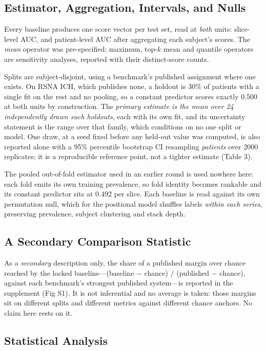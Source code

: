 \documentclass[11pt,letterpaper]{article}
\begin{document}
\subsection*{Estimator, Aggregation, Intervals, and Nulls}

Every baseline produces one score vector per test set, read at \emph{both}
units: slice-level AUC, and patient-level AUC after aggregating each subject's
scores. The \emph{mean} operator was pre-specified; maximum, top-$k$ mean and quantile
operators are sensitivity analyses, reported with their distinct-score counts.

Splits are subject-disjoint, using a benchmark's published assignment where one
exists. On RSNA ICH, which publishes none, a holdout is 30\% of patients with a
single fit on the rest and no pooling, so a constant predictor scores exactly
0.500 at both units by construction. The \emph{primary estimate is the mean over
24 independently drawn such holdouts}, each with its own fit, and its uncertainty
statement is the range over that family, which conditions on no one split or
model. One draw, at a seed fixed before any held-out value was computed, is also
reported alone with a 95\% percentile bootstrap CI resampling \emph{patients}
over 2000 replicates; it is a reproducible reference point, not a tighter
estimate (Table 3).

The pooled out-of-fold estimator used in an earlier round is used nowhere here:
each fold emits its own training prevalence, so fold identity becomes rankable
and its constant predictor sits at 0.492 per slice. Each baseline is read against
its own permutation null, which for the positional model shuffles labels
\emph{within each series}, preserving prevalence, subject clustering and stack
depth.

\subsection*{A Secondary Comparison Statistic}

As a \emph{secondary} description only, the share of a published margin over
chance reached by the locked baseline---(baseline $-$ chance) $/$ (published $-$
chance), against each benchmark's strongest published system---is reported in the
supplement (Fig S1). It is not inferential and no average is taken: those
margins sit on different splits and different metrics against different chance
anchors. No claim here rests on it.

\subsection*{Statistical Analysis}
\end{document}
